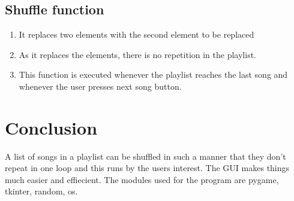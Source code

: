 \documentclass{article}
\begin{document}
\subsection*{Shuffle function}
\begin{enumerate}
    \item It replaces two elements with the second element to be replaced
    \item As it replaces the elements, there is no repetition in the playlist.
    \item This function is executed whenever the playlist reaches the last song and whenever the user presses next song button.
\end{enumerate}

\section*{Conclusion}

	A list of songs in a playlist can be shuffled in such a manner that they don't repeat in one loop and this runs by the users interest. The GUI makes things much easier and effiecient. The modules used for the program are pygame, tkinter, random, os.
\end{document}
